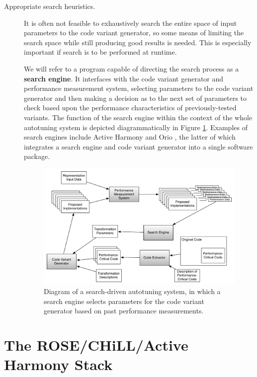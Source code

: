 \documentclass[msthesis,justified,copyright,final,numbers,sort&compress,
gsmodern,amstex,natbib]{uothesis}
\begin{document}
\begin{description}
\item[Appropriate search heuristics.]

It is often not feasible to exhaustively search the entire space of input parameters to the code variant generator, so some means of limiting the search space while still producing good results is needed. This is especially important if search is to be performed at runtime.

We will refer to a program capable of directing the search process as a \textbf{search engine}. It interfaces with the code variant generator and performance measurement system, selecting parameters to the code variant generator and then making a decision as to the next set of parameters to check based upon the performance characteristics of previously-tested variants. The function of the search engine within the context of the whole autotuning system is depicted diagrammatically in Figure \ref{fig:whole-system}. Examples of search engines include Active Harmony \cite{harmony,full,end-to-end,adaptive} and Orio \cite{orio,orio2,orio3}, the latter of which integrates a search engine and code variant generator into a single software package.

\begin{figure}[tbp]
\centering
\includegraphics[width=\textwidth]{whole-system.pdf}
\caption[Diagram of a search-driven autotuning system]{Diagram of a search-driven autotuning system, in which a search engine selects parameters for the code variant generator based on past performance measurements.}
\label{fig:whole-system}
\end{figure}

\end{description}

\section{The ROSE/CHiLL/Active Harmony Stack}
\label{rosechill}
\end{document}

